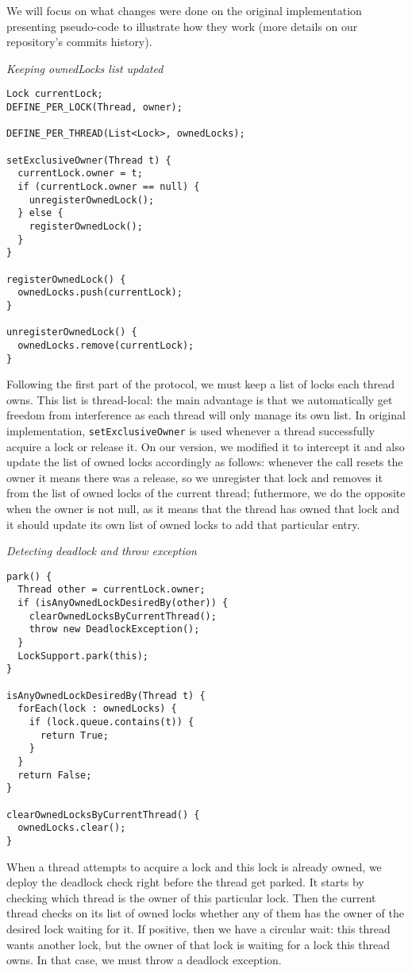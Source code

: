 We will focus on what changes were done on the original implementation presenting pseudo-code to illustrate how they work (more details on our repository's commits history).

\medskip
\noindent
{\it Keeping ownedLocks list updated}
\begin{verbatim}
Lock currentLock;
DEFINE_PER_LOCK(Thread, owner);

DEFINE_PER_THREAD(List<Lock>, ownedLocks);

setExclusiveOwner(Thread t) {
  currentLock.owner = t;
  if (currentLock.owner == null) {
    unregisterOwnedLock();
  } else {
    registerOwnedLock();
  }
}

registerOwnedLock() {
  ownedLocks.push(currentLock);
}

unregisterOwnedLock() {
  ownedLocks.remove(currentLock);
}
\end{verbatim}

Following the first part of the protocol, we must keep a list of locks each thread owns.
This list is thread-local: the main advantage is that we automatically get freedom from interference as each thread will only manage its own list.
In original implementation, {\tt setExclusiveOwner} is used whenever a thread successfully acquire a lock or release it.
On our version, we modified it to intercept it and also update the list of owned locks accordingly as follows:
whenever the call resets the owner it means there was a release, so we unregister that lock and removes it from the list of owned locks of the current thread;
futhermore, we do the opposite when the owner is not null, as it means that the thread has owned that lock and it should update its own list of owned locks to add that particular entry.

\medskip
\noindent
{\it Detecting deadlock and throw exception}
\begin{verbatim}
park() {
  Thread other = currentLock.owner;
  if (isAnyOwnedLockDesiredBy(other)) {
    clearOwnedLocksByCurrentThread();
    throw new DeadlockException();
  }
  LockSupport.park(this);
}

isAnyOwnedLockDesiredBy(Thread t) {
  forEach(lock : ownedLocks) {
    if (lock.queue.contains(t)) {
      return True;
    }
  }
  return False;
}

clearOwnedLocksByCurrentThread() {
  ownedLocks.clear();
}
\end{verbatim}

When a thread attempts to acquire a lock and this lock is already owned, we deploy the deadlock check right before the thread get parked.
It starts by checking which thread is the owner of this particular lock.
Then the current thread checks on its list of owned locks whether any of them has the owner of the desired lock waiting for it.
If positive, then we have a circular wait: this thread wants another lock, but the owner of that lock is waiting for a lock this thread owns.
In that case, we must throw a deadlock exception.

